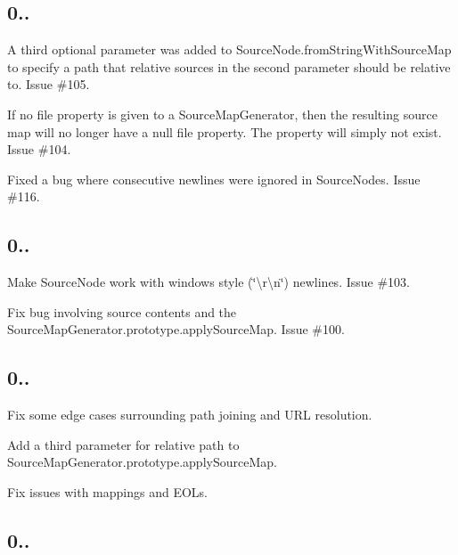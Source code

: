 \subsection*{0..}


\begin{DoxyItemize}
\item A third optional parameter was added to {\ttfamily Source\+Node.\+from\+String\+With\+Source\+Map} to specify a path that relative sources in the second parameter should be relative to. Issue \#105.
\item If no file property is given to a {\ttfamily Source\+Map\+Generator}, then the resulting source map will no longer have a {\ttfamily null} file property. The property will simply not exist. Issue \#104.
\item Fixed a bug where consecutive newlines were ignored in {\ttfamily Source\+Node}s. Issue \#116.
\end{DoxyItemize}

\subsection*{0..}


\begin{DoxyItemize}
\item Make {\ttfamily Source\+Node} work with windows style (\char`\"{}\textbackslash{}r\textbackslash{}n\char`\"{}) newlines. Issue \#103.
\item Fix bug involving source contents and the {\ttfamily Source\+Map\+Generator.\+prototype.\+apply\+Source\+Map}. Issue \#100.
\end{DoxyItemize}

\subsection*{0..}


\begin{DoxyItemize}
\item Fix some edge cases surrounding path joining and U\+R\+L resolution.
\item Add a third parameter for relative path to {\ttfamily Source\+Map\+Generator.\+prototype.\+apply\+Source\+Map}.
\item Fix issues with mappings and E\+O\+Ls.
\end{DoxyItemize}

\subsection*{0..}


